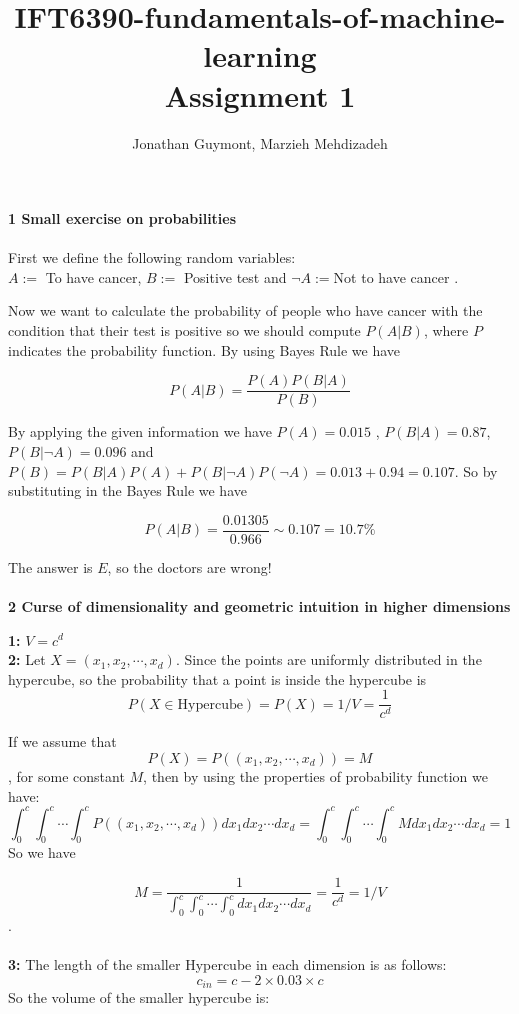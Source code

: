 \documentclass[12pt,english]{amsart}
\title{IFT6390-fundamentals-of-machine-learning\\Assignment 1}
\author{Jonathan Guymont, Marzieh Mehdizadeh}
\date{}
\theoremstyle{definition}
\begin{document}
\maketitle

\textbf{1 Small exercise on probabilities}\\\\

First we define the following random variables:\\
$A:=$ To have cancer, $B:=$ Positive test and $\neg A:= $Not to have cancer .

Now we want to calculate the probability of people who have cancer with the condition that their test is positive so we should compute $P(A|B)$, where $P$ indicates the probability function. By using Bayes Rule we have

$$P(A|B)= \frac{P(A) P(B|A)}{P(B)}$$

By applying the given information we have
$P(A)= 0.015$ , $P(B|A)=0.87$, $P(B|\neg A)= 0.096$ and 
 $P(B)= P(B|A)P(A)+P(B| \neg A)P(\neg A)= 0.013+0.94= 0.107 $. So by substituting in the Bayes Rule we have
 
 $$ P(A|B)= \frac{0.01305}{0.966} \sim 0.107= 10.7 \%$$
 
The answer is $E$, so the doctors are wrong! \\\\

\textbf{2 Curse of dimensionality and geometric intuition
in higher dimensions}


\textbf{1:} $V= c^d$\\

\textbf{2:} Let $X=(x_1, x_2, \cdots, x_d)$. Since the points are uniformly distributed in the hypercube, so the probability that a point is inside the hypercube is $$P(X\in \text{Hypercube})=P(X)=1/V= \frac{1}{c^d}$$

If we assume that $$P(X)= P((x_1, x_2,\cdots, x_d))= M $$, for some constant $M$, then by using the properties of probability function we have:
$$\int_{0}^{c}\int_{0}^{c}\cdots \int_{0}^{c} P((x_1, x_2,\cdots, x_d)) dx_1 dx_2 \cdots dx_d= \int_{0}^{c}\int_{0}^{c}\cdots \int_{0}^{c} M dx_1 dx_2 \cdots dx_d=1$$
So we have

$$M= \frac{1}{\int_{0}^{c}\int_{0}^{c}\cdots \int_{0}^{c}  dx_1 dx_2 \cdots dx_d} = \frac{1}{c^d} = 1/V$$.\\\\
\textbf{3:}  The length of the smaller Hypercube in each dimension is as follows:
$$c_{in}  = c- 2\times 0.03 \times c$$ 
So the volume of the smaller hypercube is:
\end{document}
